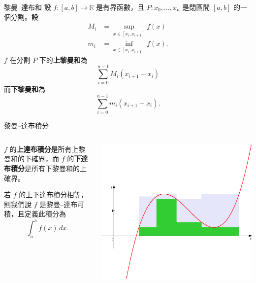 \documentclass{beamer}
\newcommand  {\R}{\mathbb R}
\theoremstyle{remark}
\begin{document}
\begin{CJK}{UTF8}{bsmi}
\begin{frame}{黎曼--達布和}
  設 $f: [a,b] \to \R$ 是有界函數，且 $P: x_0, \dots, x_n$ 是閉區間 $[a,b]$ 的一個分割。設
  \begin{align*}
    M_i &= \sup_{x \in [x_i, x_{i+1}]} f(x)\\
    m_i &= \inf_{x \in [x_i, x_{i+1}]} f(x).
  \end{align*}
  $f$ 在分割 $P$ 下的\textbf{上黎曼和}為
  \[\sum_{i=0}^{n-1} M_i \left( x_{i+1} - x_i \right)\]
  而\textbf{下黎曼和}為
  \[\sum_{i=0}^{n-1} m_i \left( x_{i+1} - x_i \right).\]
\end{frame}

\begin{frame}{黎曼--達布積分}
  \begin{columns}
    \begin{column}{0.5\textwidth}
      $f$ 的\textbf{上達布積分}是所有上黎曼和的下確界，而 $f$ 的\textbf{下達布積分}是所有下黎曼和的上確界。

      若 $f$ 的上下達布積分相等，則我們說 $f$ 是黎曼--達布可積，且定義此積分為
      \[\int_a^b f(x)\,dx.\]
    \end{column}
    \begin{column}{0.5\textwidth}
      \begin{center}
	\includegraphics[width=\textwidth]{Darboux}
      \end{center}
    \end{column}
  \end{columns}
\end{frame}


\end{CJK}
\end{document}

